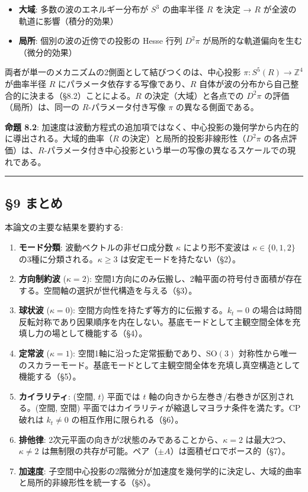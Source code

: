 \documentclass[
  a4paper,11pt]{ltjsarticle}
\providecommand{\tightlist}{%
  \setlength{\itemsep}{0pt}\setlength{\parskip}{0pt}}
\theoremstyle{definition}
\theoremstyle{remark}
\begin{document}
\begin{itemize}
\tightlist
\item
  \textbf{大域}: 多数の波のエネルギー分布が \(S^3\) の曲率半径 \(R\)
  を決定 → \(R\) が全波の軌道に影響（積分的効果）
\item
  \textbf{局所}: 個別の波の近傍での投影の Hesse 行列 \(D^2\pi\)
  が局所的な軌道偏向を生む（微分的効果）
\end{itemize}

両者が単一のメカニズムの2側面として結びつくのは、中心投影
\(\pi: S^5(R) \to \mathbb{Z}^4\) が曲率半径 \(R\)
にパラメータ依存する写像であり、\(R\)
自体が波の分布から自己整合的に決まる（§8.2）ことによる。\(R\)
の決定（大域）と各点での \(D^2\pi\) の評価（局所）は、同一の
\(R\)-パラメータ付き写像 \(\pi\) の異なる側面である。

\textbf{命題 8.2}:
加速度は波動方程式の追加項ではなく、中心投影の幾何学から内在的に導出される。大域的曲率（\(R\)
の決定）と局所的投影非線形性（\(D^2\pi\)
の各点評価）は、\(R\)-パラメータ付き中心投影という単一の写像の異なるスケールでの現れである。

\begin{center}\rule{0.5\linewidth}{0.5pt}\end{center}

\subsection{§9 まとめ}\label{ux307eux3068ux3081}

本論文の主要な結果を要約する:

\begin{enumerate}
\def\labelenumi{\arabic{enumi}.}
\item
  \textbf{モード分類}: 波動ベクトルの非ゼロ成分数 \(\kappa\)
  により形不変波は \(\kappa \in \{0, 1, 2\}\)
  の3種に分類される。\(\kappa \geq 3\) は安定モードを持たない（§2）。
\item
  \textbf{方向制約波} (\(\kappa = 2\)):
  空間1方向にのみ伝搬し、2軸平面の符号付き面積が存在する。空間軸の選択が世代構造を与える（§3）。
\item
  \textbf{球状波} (\(\kappa = 0\)):
  空間方向性を持たず等方的に伝搬する。\(k_t = 0\)
  の場合は時間反転対称であり因果順序を内在しない。基底モードとして主観空間全体を充填し力の場として機能する（§4）。
\item
  \textbf{定常波} (\(\kappa = 1\)):
  空間1軸に沿った定常振動であり、\(\mathrm{SO}(3)\)
  対称性から唯一のスカラーモード。基底モードとして主観空間全体を充填し真空構造として機能する（§5）。
\item
  \textbf{カイラリティ}: (空間, \(t\)) 平面では \(t\)
  軸の向きから左巻き/右巻きが区別される。(空間, 空間)
  平面ではカイラリティが縮退しマヨラナ条件を満たす。CP破れは
  \(k_t \neq 0\) の相互作用に限られる（§6）。
\item
  \textbf{排他律}:
  2次元平面の向きが2状態のみであることから、\(\kappa = 2\)
  は最大2つ、\(\kappa \neq 2\)
  は無制限の共存が可能。ペア（\(\pm A\)）は面積ゼロでボース的（§7）。
\item
  \textbf{加速度}:
  子空間中心投影の2階微分が加速度を幾何学的に決定し、大域的曲率と局所的非線形性を統一する（§8）。
\end{enumerate}
\end{document}
